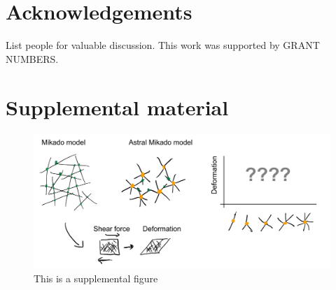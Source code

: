 \documentclass[onecolumn,11pt]{article}
\begin{document}
\section*{Acknowledgements}
List people for valuable discussion.
This work was supported by GRANT NUMBERS.




\clearpage
\setcounter{table}{0}
        \renewcommand{\thetable}{S\arabic{table}}%
\setcounter{figure}{0}
        \renewcommand{\thefigure}{S\arabic{figure}}%
\renewcommand{\listfigurename}{List of Supporting Figures}
\renewcommand{\contentsname}{List of Supporting Text}

\section{Supplemental material}

\begin{figure}[h!t]
\centering
\includegraphics[width=4.5in]{figures/figJeanJacket.pdf}
\caption{This is a supplemental figure}
\label{fig:DetailedJeanJacketSchematic}
\end{figure}
\end{document}
